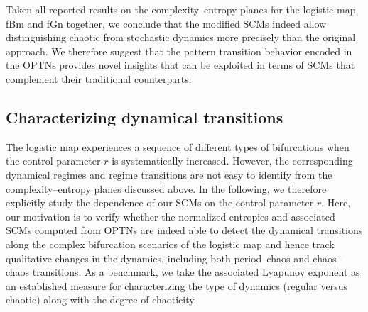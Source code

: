 \documentclass[12pt,aip,cha,reprint,nofootinbib]{revtex4-1}
\begin{document}
Taken all reported results on the complexity--entropy planes for the logistic map, fBm and fGn together, we conclude that the modified SCMs indeed allow distinguishing chaotic from stochastic dynamics more precisely than the original approach. We therefore suggest that the pattern transition behavior encoded in the OPTNs provides novel insights that can be exploited in terms of SCMs that complement their traditional counterparts. 


\subsection{Characterizing dynamical transitions} \label{sec:transi}
The logistic map experiences a sequence of different types of bifurcations when the control parameter $r$ is systematically increased. However, the corresponding dynamical regimes and regime transitions are not easy to identify from the complexity--entropy planes discussed above. In the following, we therefore explicitly study the dependence of our SCMs on the control parameter $r$. Here, our motivation is to verify whether the normalized entropies and associated SCMs computed from OPTNs are indeed able to detect the dynamical transitions along the complex bifurcation scenarios of the logistic map and hence track qualitative changes in the dynamics, including both period--chaos and chaos--chaos transitions. As a benchmark, we take the associated Lyapunov exponent as an established measure for characterizing the type of dynamics (regular versus chaotic) along with the degree of chaoticity.
\end{document}
